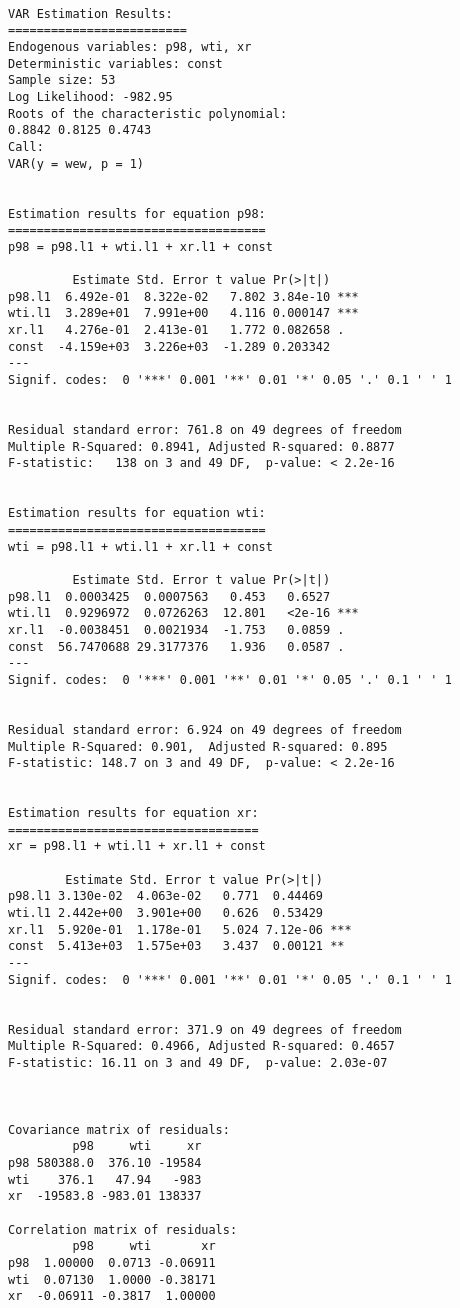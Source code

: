 \documentclass[
  a4paper,
  DIV=11,
  numbers=noendperiod]{scrreprt}
\begin{document}
\begin{verbatim}

VAR Estimation Results:
========================= 
Endogenous variables: p98, wti, xr 
Deterministic variables: const 
Sample size: 53 
Log Likelihood: -982.95 
Roots of the characteristic polynomial:
0.8842 0.8125 0.4743
Call:
VAR(y = wew, p = 1)


Estimation results for equation p98: 
==================================== 
p98 = p98.l1 + wti.l1 + xr.l1 + const 

         Estimate Std. Error t value Pr(>|t|)    
p98.l1  6.492e-01  8.322e-02   7.802 3.84e-10 ***
wti.l1  3.289e+01  7.991e+00   4.116 0.000147 ***
xr.l1   4.276e-01  2.413e-01   1.772 0.082658 .  
const  -4.159e+03  3.226e+03  -1.289 0.203342    
---
Signif. codes:  0 '***' 0.001 '**' 0.01 '*' 0.05 '.' 0.1 ' ' 1


Residual standard error: 761.8 on 49 degrees of freedom
Multiple R-Squared: 0.8941, Adjusted R-squared: 0.8877 
F-statistic:   138 on 3 and 49 DF,  p-value: < 2.2e-16 


Estimation results for equation wti: 
==================================== 
wti = p98.l1 + wti.l1 + xr.l1 + const 

         Estimate Std. Error t value Pr(>|t|)    
p98.l1  0.0003425  0.0007563   0.453   0.6527    
wti.l1  0.9296972  0.0726263  12.801   <2e-16 ***
xr.l1  -0.0038451  0.0021934  -1.753   0.0859 .  
const  56.7470688 29.3177376   1.936   0.0587 .  
---
Signif. codes:  0 '***' 0.001 '**' 0.01 '*' 0.05 '.' 0.1 ' ' 1


Residual standard error: 6.924 on 49 degrees of freedom
Multiple R-Squared: 0.901,  Adjusted R-squared: 0.895 
F-statistic: 148.7 on 3 and 49 DF,  p-value: < 2.2e-16 


Estimation results for equation xr: 
=================================== 
xr = p98.l1 + wti.l1 + xr.l1 + const 

        Estimate Std. Error t value Pr(>|t|)    
p98.l1 3.130e-02  4.063e-02   0.771  0.44469    
wti.l1 2.442e+00  3.901e+00   0.626  0.53429    
xr.l1  5.920e-01  1.178e-01   5.024 7.12e-06 ***
const  5.413e+03  1.575e+03   3.437  0.00121 ** 
---
Signif. codes:  0 '***' 0.001 '**' 0.01 '*' 0.05 '.' 0.1 ' ' 1


Residual standard error: 371.9 on 49 degrees of freedom
Multiple R-Squared: 0.4966, Adjusted R-squared: 0.4657 
F-statistic: 16.11 on 3 and 49 DF,  p-value: 2.03e-07 



Covariance matrix of residuals:
         p98     wti     xr
p98 580388.0  376.10 -19584
wti    376.1   47.94   -983
xr  -19583.8 -983.01 138337

Correlation matrix of residuals:
         p98     wti       xr
p98  1.00000  0.0713 -0.06911
wti  0.07130  1.0000 -0.38171
xr  -0.06911 -0.3817  1.00000
\end{verbatim}
\end{document}
